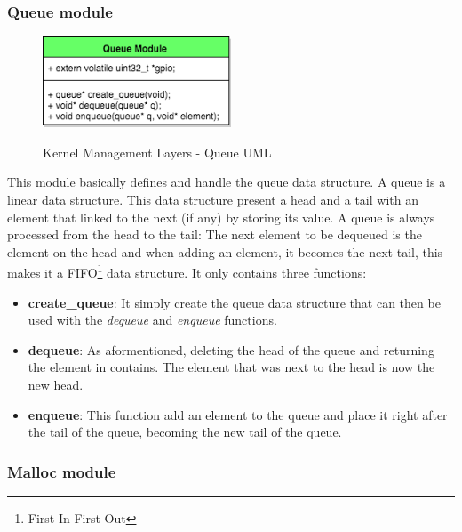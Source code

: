 \subsubsection{Queue module}


\begin{figure}[H]
\begin{center}
\includegraphics[width=0.5\textwidth]{includes/figures/chapter5_kernel_management_layer_queue_UML.png}  \\
\caption{Kernel Management Layers - Queue UML}
\end{center}
\label{fig:chapter5_kernel_management_layer_queue_UML}
\end{figure}

This module basically defines and handle the queue data structure. A queue is a linear data structure. This data structure present a head and a tail with an element that linked to the next (if any) by storing its value. A queue is always processed from the head to the tail: The next element to be dequeued is the element on the head and when adding an element, it becomes the next tail, this makes it a FIFO\footnote{First-In First-Out} data structure.
It only contains three functions:
\begin{itemize}
	\item \textbf{create\_queue}: It simply create the queue data structure that can then be used with the \textit{dequeue} and \textit{enqueue} functions.
	\item \textbf{dequeue}: As aformentioned, deleting the head of the queue and returning the element in contains. The element that was next to the head is now the new head.
	\item \textbf{enqueue}: This function add an element to the queue and place it right after the tail of the queue, becoming the new tail of the queue.
\end{itemize}


\subsubsection{Malloc module}


